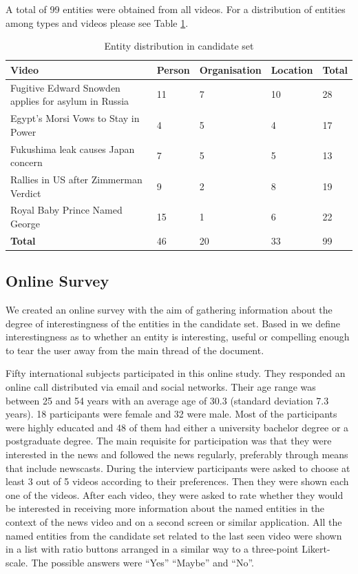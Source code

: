 \documentclass{llncs}
\begin{document}
A total of 99 entities were obtained from all videos. For a distribution of entities among types and videos please see Table \ref{table:entitydistribution}.

\begin{table}[h]
\begin{tabular}{| p{6cm} | l| l| l| l|}
  \hline
  \textbf{Video} & \textbf{Person} & \textbf{Organisation} &\textbf{Location} & \textbf{Total} \\
    \hline
  Fugitive Edward Snowden applies for asylum in Russia & 11 & 7 & 10 & 28 \\
    \hline
 Egypt's Morsi Vows to Stay in Power & 4 & 5 & 4 & 17 \\
    \hline
 Fukushima leak causes Japan concern & 7 & 5 & 5 & 13\\
    \hline
 Rallies in US after Zimmerman Verdict & 9 & 2 & 8 & 19 \\
    \hline
 Royal Baby Prince Named George & 15 & 1 & 6 & 22 \\
    \hline
    \textbf{Total}  & 46 & 20 & 33 & 99\\
  \hline
\end{tabular}
\caption[Table caption text]{Entity distribution in candidate set}
\label{table:entitydistribution}
\end{table}

\subsection{Online Survey}
We created an online survey with the aim of gathering information about the degree of interestingness of the entities in the candidate set. Based in \cite{vonBrzeski:2007:LCU:1321440.1321537} we define interestingness as to whether an entity is interesting, useful or compelling enough to tear the user away from the main thread of the document. 

Fifty international subjects participated in this online study. They responded an online call distributed via email and social networks. Their age range was between 25 and 54 years with an average age of 30.3 (standard deviation 7.3 years). 18 participants were female and 32 were male. Most of the participants were highly educated and 48 of them had either a university bachelor degree or a postgraduate degree. The main requisite for participation was that they were interested in the news and followed the news regularly, preferably through means that include newscasts.
During the interview participants were asked to choose at least 3 out of 5 videos according to their preferences. Then they were shown each one of the videos. After each video, they were asked to rate whether they would be interested in receiving more information about the named entities in the context of the news video and on a second screen or similar application. All the named entities from the candidate set related to the last seen video were shown in a list with ratio buttons arranged in a similar way to a three-point Likert-scale. The possible answers were ``Yes'' ``Maybe'' and ``No''. 
\end{document}
